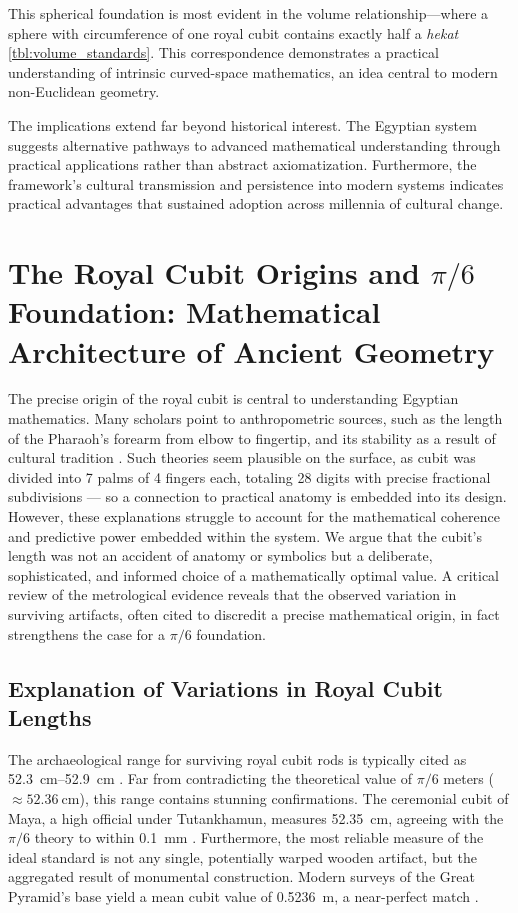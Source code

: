 \documentclass[11pt]{article}
\begin{document}
This spherical foundation is most evident in the volume relationship—where a sphere with circumference of one royal cubit contains exactly half a \textit{hekat} \ref{tbl:volume_standards}. This correspondence demonstrates a practical understanding of intrinsic curved-space mathematics, an idea central to modern non-Euclidean geometry.

The implications extend far beyond historical interest. The Egyptian system suggests alternative pathways to advanced mathematical understanding through practical applications rather than abstract axiomatization. Furthermore, the framework's cultural transmission and persistence into modern systems indicates practical advantages that sustained adoption across millennia of cultural change.

\section{The Royal Cubit Origins and \texorpdfstring{$\pi/6$}{pi/6} Foundation: Mathematical Architecture of Ancient Geometry}

The precise origin of the royal cubit is central to understanding Egyptian mathematics. Many scholars point to anthropometric sources, such as the length of the Pharaoh's forearm from elbow to fingertip, and its stability as a result of cultural tradition \cite{stone2014cubit, imhausen2016mathematics}. Such theories seem plausible on the surface, as cubit was divided into 7 palms of 4 fingers each, totaling 28 digits with precise fractional subdivisions — so a connection to practical anatomy is embedded into its design. However, these explanations struggle to account for the mathematical coherence and predictive power embedded within the system. We argue that the cubit's length was not an accident of anatomy or symbolics but a deliberate, sophisticated, and informed choice of a mathematically optimal value. A critical review of the metrological evidence reveals that the observed variation in surviving artifacts, often cited to discredit a precise mathematical origin, in fact strengthens the case for a $\pi/6$ foundation.



\subsection{Explanation of Variations in Royal Cubit Lengths}
\label{sec:length_variations}

The archaeological range for surviving royal cubit rods is typically cited as \SIrange{52.3}{52.9}{\centi\meter} \cite{lepsius1865altagyptische}. Far from contradicting the theoretical value of $\pi/6$ meters ($\approx\SI{52.36}{\centi\meter}$), this range contains stunning confirmations. The ceremonial cubit of Maya, a high official under Tutankhamun, measures \SI{52.35}{\centi\meter}, agreeing with the $\pi/6$ theory to within \SI{0.1}{\milli\meter} \cite{imhausen2016mathematics}. Furthermore, the most reliable measure of the ideal standard is not any single, potentially warped wooden artifact, but the aggregated result of monumental construction. Modern surveys of the Great Pyramid's base yield a mean cubit value of \SI{0.5236}{\meter}, a near-perfect match \cite{dash2015survey}.
\end{document}
